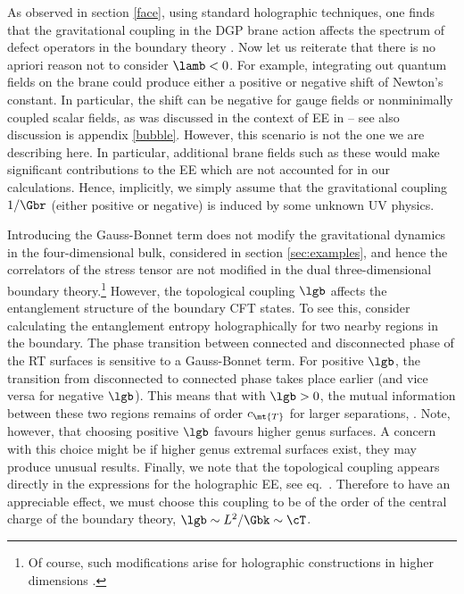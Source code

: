 As observed in section \ref{face}, using standard holographic techniques, one finds that the gravitational coupling in the DGP brane action  affects the spectrum of defect operators in the boundary theory \cite{domino}. Now let us reiterate that there is no apriori reason not to consider $\lamb<0$. For example, integrating out quantum fields on the brane could produce either a positive or negative shift of Newton's constant. In particular, the shift can be negative for gauge fields or nonminimally coupled scalar fields, as was discussed in the context of EE in \cite{Larsen:1995ax,Kabat:1995eq} -- see also discussion is appendix \ref{bubble}. However, this scenario is not the one we are describing here. In particular, additional brane fields such as these would make significant contributions to the EE which are not accounted for in our calculations. Hence, implicitly, we simply assume that the gravitational coupling $1/\Gbr$ (either positive or negative) is induced by some unknown UV physics.

Introducing the Gauss-Bonnet term  does not modify the gravitational dynamics in the four-dimensional bulk, considered in section \ref{sec:examples}, and hence the correlators of the stress tensor are not modified in the dual three-dimensional boundary theory.\footnote{Of course, such modifications arise for holographic constructions in higher dimensions \cite{Buchel:2009sk}.} However, the topological coupling $\lgb$ affects the entanglement structure of the boundary CFT states. To see this, consider calculating the entanglement entropy holographically for two nearby regions in the boundary. The phase transition between connected and disconnected phase of the RT surfaces is sensitive to a Gauss-Bonnet term. For positive $\lgb$, the transition from disconnected to connected phase takes place earlier (and vice versa for negative $\lgb$). This means that with $\lgb>0$, the mutual information between these two regions remains of order $c_\mt{T}$ for larger separations, \eg \cite{Headrick:2010zt}. Note, however, that choosing positive $\lgb$ favours higher genus surfaces. A concern with this choice might be if higher genus extremal surfaces exist, they may produce unusual results. Finally, we note that the topological coupling appears directly in the expressions for the holographic EE, \eg see eq.~. Therefore to have an appreciable effect, we must choose this coupling to be of the order of the central charge of the boundary theory, \ie $\lgb\sim L^2/\Gbk\sim \cT$.

